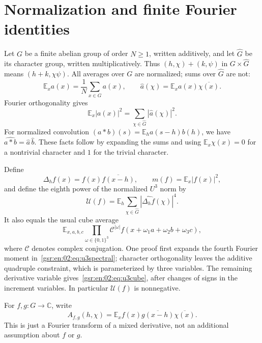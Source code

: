 \documentclass[11pt,letterpaper]{article}
\numberwithin{equation}{section}
\theoremstyle{definition}
\theoremstyle{remark}
\newcommand{\E}{\mathbb E}
\newcommand{\C}{\mathbb C}
\newcommand{\1}{\mathbf 1}
\newcommand{\U}{\mathcal U}
\newcommand{\srctag}[1]{\texorpdfstring{\enspace\textup{[#1]}}{ [#1]}}
\newcommand{\srcnote}[2]{\par\noindent{\small\textit{Source #1, delivered #2.}}\par}
\begin{document}
\section[{Normalization and finite Fourier identities\srctag{02}}]{Normalization and finite Fourier identities}\label{gsr:en:02:sec:d2}
\srcnote{02}{Section 2}
Let $G$ be a finite abelian group of order $N\geq1$, written additively, and let $\widehat G$ be its character group, written multiplicatively. Thus $(h,\chi)+(k,\psi)$ in $G\times\widehat G$ means $(h+k,\chi\psi)$. All averages over $G$ are normalized; sums over $\widehat G$ are not:
\[
 \E_x a(x)=\frac1N\sum_{x\in G}a(x),\qquad
 \widehat a(\chi)=\E_xa(x)\overline{\chi(x)}.
\]
Fourier orthogonality gives
\begin{equation}\label{gsr:en:02:eq:parseval}
 \E_x|a(x)|^2=\sum_{\chi\in\widehat G}|\widehat a(\chi)|^2.
\end{equation}
For normalized convolution $(a*b)(s)=\E_h a(s-h)b(h)$, we have $\widehat{a*b}=\widehat a\,\widehat b$. These facts follow by expanding the sums and using $\E_x\chi(x)=0$ for a nontrivial character and $1$ for the trivial character.

Define
\[
 \Delta_hf(x)=f(x)\overline{f(x-h)},\qquad m(f)=\E_x|f(x)|^2,
\]
and define the eighth power of the normalized $U^3$ norm by
\begin{equation}\label{gsr:en:02:eq:u3spectral}
 \U(f)=\E_h\sum_{\chi\in\widehat G}
              |\widehat{\Delta_hf}(\chi)|^4.
\end{equation}
It also equals the usual cube average
\begin{equation}\label{gsr:en:02:eq:u3cube}
 \E_{x,a,b,c}\prod_{\omega\in\{0,1\}^3}
  \mathcal C^{|\omega|} f(x+\omega_1a+\omega_2b+\omega_3c),
\end{equation}
where $\mathcal C$ denotes complex conjugation. One proof first expands the fourth Fourier moment in~\eqref{gsr:en:02:eq:u3spectral}; character orthogonality leaves the additive quadruple constraint, which is parameterized by three variables. The remaining derivative variable gives~\eqref{gsr:en:02:eq:u3cube}, after changes of signs in the increment variables. In particular $\U(f)$ is nonnegative.

For $f,g:G\to\C$, write
\[
 A_{f,g}(h,\chi)=\E_x f(x)\overline{g(x-h)}\overline{\chi(x)}.
\]
This is just a Fourier transform of a mixed derivative, not an additional assumption about $f$ or $g$.
\end{document}
